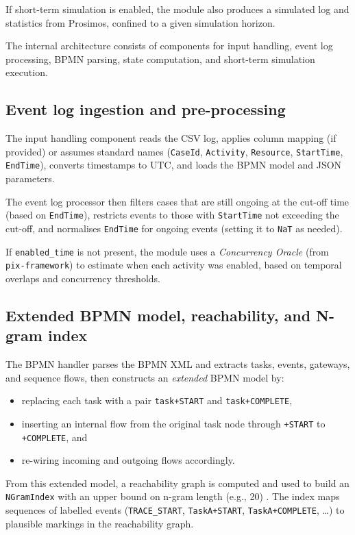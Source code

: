 \documentclass[a4paper,fleqn]{cas-sc}
\begin{document}
If short-term simulation is enabled, the module also produces a
simulated log and statistics from Prosimos, confined to a given
simulation horizon.

The internal architecture consists of components for input handling,
event log processing, BPMN parsing, state computation, and
short-term simulation execution.

\subsection{Event log ingestion and pre-processing}

The input handling component reads the CSV log, applies column
mapping (if provided) or assumes standard names (\texttt{CaseId},
\texttt{Activity}, \texttt{Resource}, \texttt{StartTime}, \texttt{EndTime}),
converts timestamps to UTC, and loads the BPMN model and JSON parameters.

The event log processor then filters cases that are still ongoing
at the cut-off time (based on \verb|EndTime|), restricts events
to those with \verb|StartTime| not exceeding the cut-off, and
normalises \verb|EndTime| for ongoing events (setting it to \verb|NaT|
as needed).

If \verb|enabled_time| is not present, the module uses a
\emph{Concurrency Oracle} (from \texttt{pix-framework}) to
estimate when each activity was enabled, based on temporal
overlaps and concurrency thresholds.

\subsection{Extended BPMN model, reachability, and N-gram index}

The BPMN handler parses the BPMN XML and extracts tasks,
events, gateways, and sequence flows, then constructs an
\emph{extended} BPMN model by:

\begin{itemize}
  \item replacing each task with a pair \texttt{task+START} and
  \texttt{task+COMPLETE},
  \item inserting an internal flow from the original task node
  through \texttt{+START} to \texttt{+COMPLETE}, and
  \item re-wiring incoming and outgoing flows accordingly.
\end{itemize}

From this extended model, a reachability graph is computed and
used to build an \verb|NGramIndex| with an upper bound on n-gram
length (e.g., 20) \citep{ChapelaCampa2025TSC}.
The index maps sequences of labelled events
(\texttt{TRACE\_START}, \texttt{TaskA+START}, \texttt{TaskA+COMPLETE}, \dots)
to plausible markings in the reachability graph.
\end{document}
